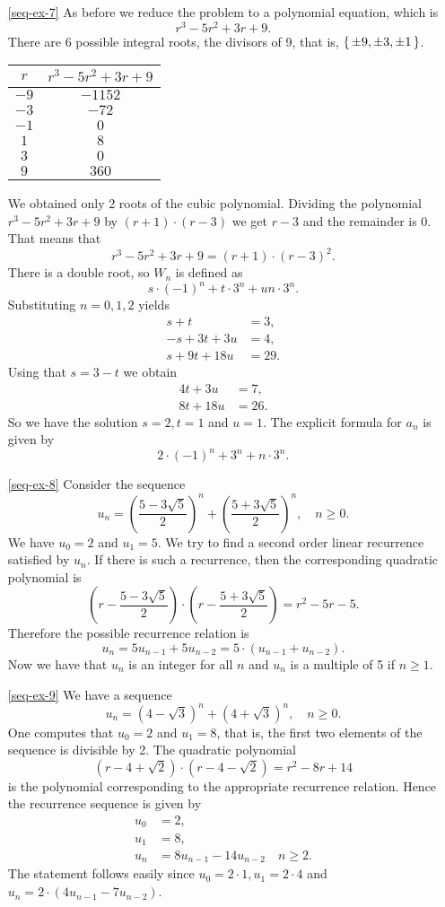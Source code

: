 \begin{enumerate}
\item[\ref{seq-ex-7}]
As before we reduce the problem to a polynomial equation, which is
$$
r^3-5r^2+3r+9.
$$
There are 6 possible integral roots, the divisors of 9, that is, $\left\{\,\pm 9,\pm 3,\pm 1\,\right\}$.
\begin{center}
\begin{tabular}{|c|c|}
\hline
$r$ & $r^3-5r^2+3r+9$\\
\hline
$-9$ & $-1152$\\
\hline
$-3$ & $-72$\\
\hline
$-1$ & $0$\\
\hline
$1$ & $8$\\
\hline
$3$ & $0$\\
\hline
$9$ & $360$\\
\hline
\end{tabular}
\end{center}
We obtained only 2 roots of the cubic polynomial. Dividing the polynomial $r^3-5r^2+3r+9$ by $(r+1)\cdot (r-3)$
we get $r-3$ and the remainder is 0. That means that 
$$
r^3-5r^2+3r+9=(r+1)\cdot (r-3)^2.
$$
There is a double root, so $W_n$ is defined as
$$
s\cdot (-1)^n+t\cdot 3^n+un\cdot 3^n.
$$
Substituting $n=0,1,2$ yields
\begin{align*}
s+t&=3,\\
-s+3t+3u&=4,\\
s+9t+18u&=29.
\end{align*}
Using that $s=3-t$ we obtain
\begin{align*}
4t+3u&=7,\\
8t+18u&=26.
\end{align*}
So we have the solution $s=2,t=1$ and $u=1$. The explicit formula for $a_n$ is given by
$$
2\cdot (-1)^n+3^n+n\cdot 3^n.
$$

\item[\ref{seq-ex-8}]
Consider the sequence
$$
u_n=\left(\frac{5-3\sqrt{5}}{2}\right)^n+\left(\frac{5+3\sqrt{5}}{2}\right)^n,\quad n\geq 0.
$$
We have $u_0=2$ and $u_1=5$. We try to find a second order linear recurrence satisfied by $u_n$.
If there is such a recurrence, then the corresponding quadratic polynomial is
$$
\left(r-\frac{5-3\sqrt{5}}{2}\right)\cdot \left(r-\frac{5+3\sqrt{5}}{2}\right)=r^2-5r-5.
$$
Therefore the possible recurrence relation is
$$
u_n=5u_{n-1}+5u_{n-2}=5\cdot (u_{n-1}+u_{n-2}).
$$
Now we have that $u_n$ is an integer for all $n$ and $u_n$ is a multiple of 5 if $n\geq 1$.

\item[\ref{seq-ex-9}]
We have a sequence
$$
u_n=(4-\sqrt{3})^n+(4+\sqrt{3})^n,\quad n\geq 0.
$$
One computes that $u_0=2$ and $u_1=8$, that is, the first two elements of the sequence is divisible by 2.
The quadratic polynomial
$$
\left(r-4+\sqrt{2}\right)\cdot \left(r-4-\sqrt{2}\right)=r^2-8r+14
$$
is the polynomial corresponding to the appropriate recurrence relation. Hence the recurrence sequence is given by
\begin{align*}
u_0&=2,\\
u_1&=8,\\
u_n&=8u_{n-1}-14u_{n-2}\quad n\geq 2.
\end{align*}
The statement follows easily since $u_0=2\cdot 1, u_1=2\cdot 4$ and $u_n=2\cdot(4u_{n-1}-7u_{n-2})$.
\end{enumerate}

\renewcommand{\theenumi}{5.\arabic{enumi}}


